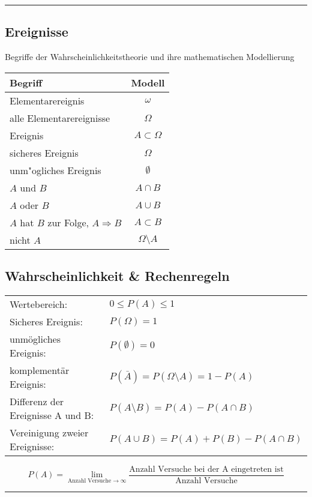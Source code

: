 \hrule
\vspace{.5cm}
\begin{minipage}[t]{6.5cm}
\subsection{Ereignisse }
Begriffe der Wahrscheinlichkeitstheorie und ihre mathematischen
Modellierung\\
\begin{tabular}{|l|c|}
\hline
Begriff&Modell\\
\hline
Elementarereignis&$\omega$\\
alle Elementarereignisse&$\Omega$\\
Ereignis&$A\subset\Omega$\\
sicheres Ereignis&$\Omega$\\
unm"ogliches Ereignis&$\emptyset$\\
$A$ und $B$&$A\cap B$\\
$A$ oder $B$&$A\cup B$\\
$A$ hat $B$ zur Folge, $A\Rightarrow B$&$A\subset B$\\
nicht $A$&$\Omega\setminus A$\\
\hline
\end{tabular}
\end{minipage}
\hspace{.5cm}
\begin{minipage}[t]{9cm}
\subsection{Wahrscheinlichkeit \& Rechenregeln }
\begin{tabular}{ll}
  Wertebereich: & ${0}\le{P(A)}\le{1}$\\
  Sicheres Ereignis:    & $P(\Omega)=1$\\
  unmögliches Ereignis: & $P(\emptyset)=0$\\
  komplementär Ereignis: & $P(\bar{A})=P({\Omega}\setminus{A})=1-P(A)$\\
  Differenz der Ereignisse A und B: & $P({A}\setminus{B})=P(A)-P({A}\cap{B})$\\
  Vereinigung zweier Ereignisse: & $P({A}\cup{B})=P(A)+P(B)-P({A}\cap{B})$\\
\end{tabular}

\[P(A)=\lim\limits_{\text{Anzahl Versuche} \to \infty} \dfrac{\text{Anzahl Versuche bei der A eingetreten ist}}{\text{Anzahl Versuche}}
\]
\end{minipage}
\vspace{.5cm}
\hrule

